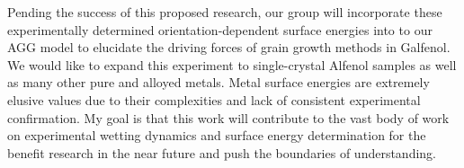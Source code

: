 
Pending the success of this proposed research, our group will incorporate these experimentally determined orientation-dependent surface energies into to our AGG model to elucidate the driving forces of grain growth methods in Galfenol. We would like to expand this experiment to single-crystal Alfenol samples as well as many other pure and alloyed metals. Metal surface energies are extremely elusive values due to their complexities and lack of consistent experimental confirmation. My goal is that this work will contribute to the vast body of work on experimental wetting dynamics and surface energy determination for the benefit research in the near future and push the boundaries of understanding.


%

